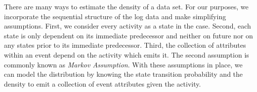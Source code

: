 \documentclass[./../../paper.tex]{subfiles}
\begin{document}


There are many ways to estimate the density of a data set. For our purposes, we incorporate the sequential structure of the log data and make simplifying assumptions. First, we consider every activity as a state in the case. Second, each state is only dependent on its immediate predecessor and neither on future nor on any states prior to its immediate predecessor. Third, the collection of attributes within an event depend on the activity which emits it. The second assumption is commonly known as \emph{Markov Assumption}. With these assumptions in place, we can model the distribution by knowing the state transition probability and the density to emit a collection of event attributes given the activity. 


\end{document}
